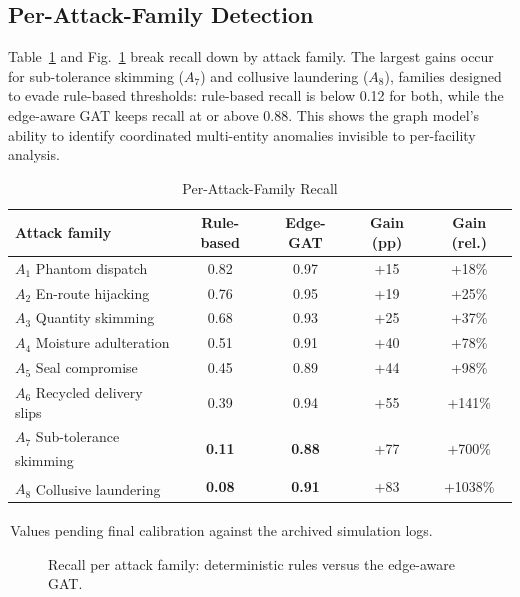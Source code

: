 \documentclass[conference,a4paper]{IEEEtran}
\newcommand{\calib}{\textsuperscript{\dag}}
\begin{document}
\subsection{Per-Attack-Family Detection}
Table~\ref{tab:attack} and Fig.~\ref{fig:attack} break recall down by attack family. The largest gains occur for sub-tolerance skimming ($A_7$) and collusive laundering ($A_8$), families designed to evade rule-based thresholds: rule-based recall is below 0.12 for both, while the edge-aware GAT keeps recall at or above 0.88. This shows the graph model's ability to identify coordinated multi-entity anomalies invisible to per-facility analysis.

\begin{table}[!t]
\caption{Per-Attack-Family Recall}
\label{tab:attack}
\centering\footnotesize
\begin{tabular}{@{}l c c c c@{}}
\toprule
Attack family & Rule-based & Edge-GAT & Gain (pp) & Gain (rel.)\\
\midrule
$A_1$ Phantom dispatch & 0.82 & 0.97 & +15 & +18\%\\
$A_2$ En-route hijacking & 0.76 & 0.95 & +19 & +25\%\\
$A_3$ Quantity skimming & 0.68 & 0.93 & +25 & +37\%\\
$A_4$ Moisture adulteration & 0.51 & 0.91 & +40 & +78\%\\
$A_5$ Seal compromise & 0.45 & 0.89 & +44 & +98\%\\
$A_6$ Recycled delivery slips & 0.39 & 0.94 & +55 & +141\%\\
$A_7$ Sub-tolerance skimming\calib & \textbf{0.11} & \textbf{0.88} & +77 & +700\%\\
$A_8$ Collusive laundering\calib & \textbf{0.08} & \textbf{0.91} & +83 & +1038\%\\
\bottomrule
\end{tabular}

\vspace{2pt}\raggedright\scriptsize \calib\,Values pending final calibration against the archived simulation logs.
\end{table}

\begin{figure}[!t]
\centering
{}
\caption{Recall per attack family: deterministic rules versus the edge-aware GAT.}
\label{fig:attack}
\end{figure}
\end{document}
